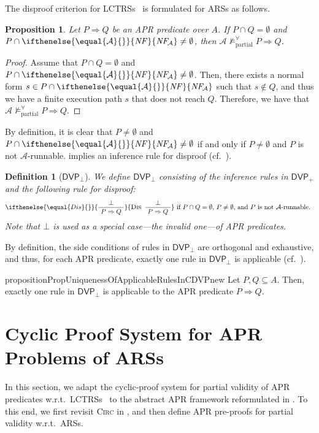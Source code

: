 \documentclass[10pt,a4paper]{article}
\newtheorem{proposition}[theorem]{Proposition}
\newtheorem{definition}[theorem]{Definition}
\def\cA{\mathcal{A}}
\newcommand{\NF}[1][]{\ifthenelse{\equal{#1}{}}{\mathit{NF}}{\mathit{NF\!}_{#1}}}
\newcommand{\ReachPred}[2]{#1 \Rightarrow #2}
\newcommand{\NotValid}[3]{#2 \mathrel{\mathrel{\not\models^\forall_{\mathrm{#1}}}} #3}
\newcommand{\NotPartiallyValid}[2][\cA]{\NotValid{partial}{#1}{#2}}
\newcommand{\RuleName}[1]{{\rm \textsc{#1}}}
\newcommand{\InfRule}[3][]{\ifthenelse{\equal{#1}{}}{\displaystyle\frac{~ #2 ~}{~ #3 ~}}{\mbox{\rm\RuleName{#1}} ~\, \displaystyle\frac{~ #2 ~}{~ #3 ~}
}}
\newcommand{\DVPnew}[1][]{\mathsf{DVP}_+}
\newcommand{\CDVPnew}[1][]{\mathsf{DVP}_\bot}
\begin{document}
The disproof criterion for LCTRSs~\cite{KN24jip} is formulated for ARSs as follows.
\begin{proposition}
	\label{prop:disproof-criterion}
	Let $\ReachPred{P}{Q}$ be an APR predicate over $A$.
	If $P \cap Q = \emptyset$
	and
	$P \cap \NF[\cA] \ne \emptyset$,
	then
	$\NotPartiallyValid{\ReachPred{P}{Q}}$.
\end{proposition}
\begin{proof}
	Assume that $P \cap Q = \emptyset$ and $P \cap \NF[\cA] \ne \emptyset$.
	Then, there exists a normal form $s \in P \cap \NF[\cA]$ such that $s \notin Q$, and thus we have a finite execution path $s$ that does not reach $Q$.
	Therefore, we have that $\NotPartiallyValid{\ReachPred{P}{Q}}$.
\end{proof}

By definition, it is clear that $P\ne \emptyset$ and $P \cap \NF[\cA] \ne \emptyset$ if and only if $P \ne \emptyset$ and $P$ is not $\cA$-runnable.
 implies an inference rule for disproof (cf.~\cite{KN24jip}).
\begin{definition}[$\CDVPnew$]
	\label{def:CDVP}
	We define $\CDVPnew$ consisting of the inference rules in $\DVPnew$ and the following rule for disproof:
	\[
		\InfRule[Dis]{\bot
		}{\ReachPred{P}{Q}}
		~\mbox{if
			$P \cap Q = \emptyset$,
			$P \ne \emptyset$,
			and
			$P$ is not $\cA$-runnable.
		}
	\]
	Note that $\bot$ is used as a special case---the \emph{invalid} one---of APR predicates.
\end{definition}
By definition, the side conditions of rules in $\CDVPnew$ are orthogonal and exhaustive, and thus,
for each APR predicate, exactly one rule in $\CDVPnew$ is applicable (cf.~\cite{KN24jip}).
\begin{restatable}{proposition}{PropUniquenessOfApplicableRulesInCDVPnew}
	\label{prop:uniqueness-of-applicable-rules-in-CDVPnew}
	Let $P,Q \subseteq A$.
	Then, exactly one rule in $\CDVPnew$ is applicable to the APR predicate $\ReachPred{P}{Q}$.
\end{restatable}


\section{Cyclic Proof System for APR Problems of ARSs}
\label{sec:cyclic-proof-system-for-ARSs}

In this section, we adapt the cyclic-proof system for partial validity of APR predicates w.r.t.\ LCTRSs~\cite{KN24jip} to the abstract APR framework reformulated in .
To this end, we first revisit \RuleName{Circ} in , and then define APR pre-proofs for partial validity w.r.t.\ ARSs.
\end{document}
